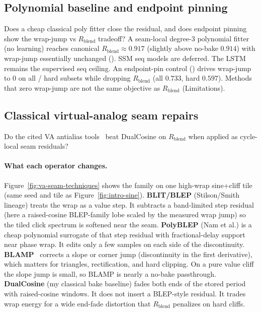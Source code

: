 \subsection{Polynomial baseline and endpoint pinning}
\label{sec:poly-jump}

Does a cheap classical poly fitter close the residual, and does endpoint pinning show the wrap-jump vs $R_{\mathrm{blend}}$ tradeoff?
A seam-local degree-3 polynomial fitter (no learning) reaches canonical $R_{\mathrm{blend}}\approx 0.917$ (slightly above no-bake $0.914$) with wrap-jump essentially unchanged ().
SSM seq models are deferred. The LSTM remains the supervised seq ceiling.
An endpoint-pin control () drives wrap-jump to $0$ on all / hard subsets while dropping $R_{\mathrm{blend}}$ (all $0.733$, hard $0.597$).
Methods that zero wrap-jump are not the same objective as $R_{\mathrm{blend}}$ (Limitations).

\subsection{Classical virtual-analog seam repairs}
\label{sec:va-seam-baselines}

Do the cited VA antialias tools~\cite{stilson1996,nam2009polyblep,esqueda2016blamp} beat DualCosine on $R_{\mathrm{blend}}$ when applied as cycle-local seam residuals?

\paragraph{What each operator changes.}
Figure~\ref{fig:va-seam-techniques} shows the family on one high-wrap sine{+}cliff tile (same seed and tile as Figure~\ref{fig:intro-sine}).
\textbf{BLIT/BLEP} (Stilson/Smith lineage) treats the wrap as a value step.
It subtracts a band-limited step residual (here a raised-cosine BLEP-family lobe scaled by the measured wrap jump) so the tiled click spectrum is softened near the seam.
\textbf{PolyBLEP} (Nam et al.) is a cheap polynomial surrogate of that step residual with fractional-delay support near phase wrap.
It edits only a few samples on each side of the discontinuity.
\textbf{BLAMP}~\cite{esqueda2016blamp} corrects a slope or corner jump (discontinuity in the first derivative), which matters for triangles, rectification, and hard clipping.
On a pure value cliff the slope jump is small, so BLAMP is nearly a no-bake passthrough.
\textbf{DualCosine} (my classical bake baseline) fades both ends of the stored period with raised-cosine windows.
It does not insert a BLEP-style residual.
It trades wrap energy for a wide end-fade distortion that $R_{\mathrm{blend}}$ penalizes on hard cliffs.

